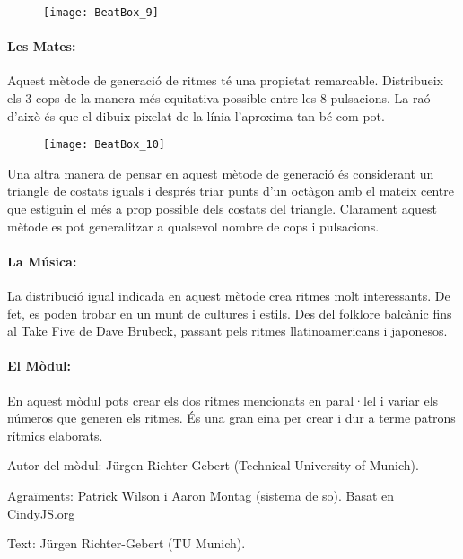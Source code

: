 \begin{figure}[h]
\centering
\texttt{[image: BeatBox\_9]}
\end{figure}

\paragraph{Les Mates:}
Aquest mètode de generació de ritmes té una propietat remarcable. Distribueix els 3 cops de la manera més equitativa possible entre les 8 pulsacions. La raó d'això és que el dibuix pixelat de la línia l'aproxima tan bé com pot.
\begin{wrapfigure}[13]{r}{0.4\textwidth}
\centering
\texttt{[image: BeatBox\_10]}
\end{wrapfigure}
Una altra manera de pensar en aquest mètode de generació és considerant un triangle de costats iguals i després triar punts d'un octàgon amb el mateix centre que estiguin el més a prop possible dels costats del triangle. Clarament aquest mètode es pot generalitzar a qualsevol nombre de cops i pulsacions.

\paragraph{La Música:} La distribució igual indicada en aquest mètode crea ritmes molt interessants. De fet, es poden trobar en un munt de cultures i estils. Des del folklore balcànic fins al Take Five de Dave Brubeck, passant pels ritmes  llatinoamericans i japonesos.

\paragraph{El Mòdul:} En aquest mòdul pots crear els dos ritmes mencionats en paral·lel i variar els números que generen els ritmes. És una gran eina per crear i dur a terme patrons rítmics elaborats.



\begin{sectcredits}
\item[Autor del mòdul:] Jürgen Richter-Gebert (Technical University of Munich).

\item[Agraïments:] Patrick Wilson i Aaron Montag (sistema de so). Basat en CindyJS.org

\item[Text:] Jürgen Richter-Gebert (TU Munich).
\end{sectcredits}
